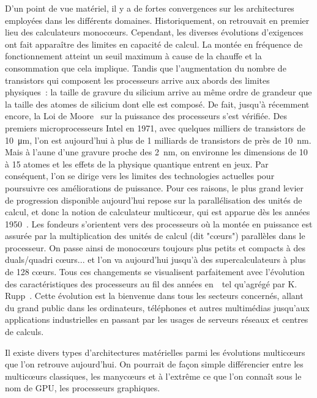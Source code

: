 \documentclass[french, a4paper, 11pt, twoside, pdftex]{StyleThese}
\begin{document}
		
		D'un point de vue matériel, il y a de fortes convergences sur les architectures employées dans les différents domaines. Historiquement, on retrouvait en premier lieu des calculateurs monocœurs. Cependant, les diverses évolutions d'exigences ont fait apparaître des limites en capacité de calcul. La montée en fréquence de fonctionnement atteint un seuil maximum à cause de la chauffe et la consommation que cela implique. Tandis que l'augmentation du nombre de transistors qui composent les processeurs arrive aux abords des limites physiques~: la taille de gravure du silicium arrive au même ordre de grandeur que la taille des atomes de silicium dont elle est composé. De fait, jusqu'à récemment encore, la Loi de Moore~\cite{thompson_moores_2006} sur la puissance des processeurs s'est vérifiée. Des premiers microprocesseurs Intel en 1971, avec quelques milliers de transistors de \SI{10}{\micro\metre}, l'on est aujourd'hui à plus de 1 milliards de transistors de près de \SI{10}{\nano\metre}. Mais à l'aune d'une gravure proche des \SI{2}{\nano\metre}, on environne les dimensions de 10 à 15 atomes et les effets de la physique quantique entrent en jeux. Par conséquent, l'on se dirige vers les limites des technologies actuelles pour poursuivre ces améliorations de puissance. Pour ces raisons, le plus grand levier de progression disponible aujourd'hui repose sur la parallélisation des unités de calcul, et donc la notion de calculateur multicœur, qui est apparue dès les années 1950~\cite{smotherman2005history}. Les fondeurs s'orientent vers des processeurs où la montée en puissance est assurée par la multiplication des unités de calcul (dit "cœurs") parallèles dans le processeur. On passe ainsi de monocœurs toujours plus petits et compacts à des duals/quadri cœurs... et l'on va aujourd'hui jusqu'à des supercalculateurs à plus de 128 cœurs. Tous ces changements se visualisent parfaitement avec l'évolution des caractéristiques des processeurs au fil des années en~\, tel qu'agrégé par K. Rupp~\cite{rupp_42_2020}. Cette évolution est la bienvenue dans tous les secteurs concernés, allant du grand public dans les ordinateurs, téléphones et autres multimédias jusqu'aux applications industrielles en passant par les usages de serveurs réseaux et centres de calculs.
		
		Il existe divers types d'architectures matérielles parmi les évolutions multicœurs que l'on retrouve aujourd'hui. On pourrait de façon simple différencier entre les multicœurs classiques, les manycœurs et à l'extrême ce que l'on connaît sous le nom de GPU, les processeurs graphiques.
		
\end{document}
